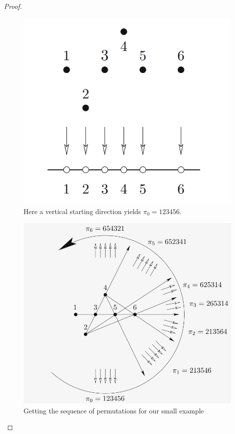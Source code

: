 \documentclass[a4paper]{article}
\begin{document}
\begin{proof}
\begin{figure}[H]
    \centering
    \includegraphics[scale=0.4]{pics/picture4.png}
    \caption{Here a vertical starting direction yields $\pi_0 = 123456$.}
\end{figure}

\begin{figure}[H]
    \centering
    \includegraphics[scale=0.6]{pics/picture5.png}
    \caption{Getting the sequence of permutations for our small example}
\end{figure}


\end{proof}
\end{document}
